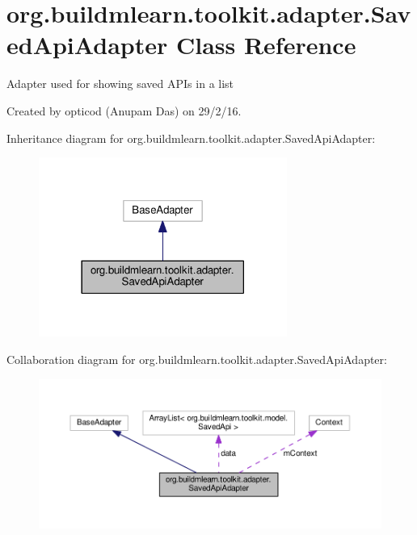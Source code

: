 \hypertarget{classorg_1_1buildmlearn_1_1toolkit_1_1adapter_1_1SavedApiAdapter}{}\section{org.\+buildmlearn.\+toolkit.\+adapter.\+Saved\+Api\+Adapter Class Reference}
\label{classorg_1_1buildmlearn_1_1toolkit_1_1adapter_1_1SavedApiAdapter}


Adapter used for showing saved A\+P\+Is in a list 

Created by opticod (Anupam Das) on 29/2/16.  




Inheritance diagram for org.\+buildmlearn.\+toolkit.\+adapter.\+Saved\+Api\+Adapter\+:
\nopagebreak
\begin{figure}[H]
\begin{center}
\leavevmode
\includegraphics[width=230pt]{classorg_1_1buildmlearn_1_1toolkit_1_1adapter_1_1SavedApiAdapter__inherit__graph}
\end{center}
\end{figure}


Collaboration diagram for org.\+buildmlearn.\+toolkit.\+adapter.\+Saved\+Api\+Adapter\+:
\nopagebreak
\begin{figure}[H]
\begin{center}
\leavevmode
\includegraphics[width=350pt]{classorg_1_1buildmlearn_1_1toolkit_1_1adapter_1_1SavedApiAdapter__coll__graph}
\end{center}
\end{figure}
